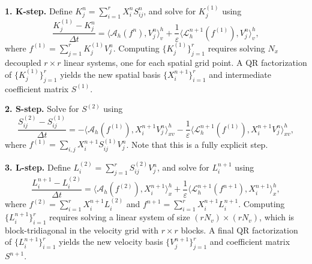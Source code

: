 \documentclass[]{article}
\numberwithin{equation}{section}
\begin{document}
\medskip
\noindent\textbf{1. K-step.} Define $K_j^n=\sum_{i=1}^r X_i^nS_{ij}^n$, and solve for $K_j^{(1)}$ using
\begin{equation}\label{eq:K_fd_imex}
  \frac{K_{j}^{(1)} - K_{j}^{n}}{\Delta t} = \langle \mathcal{A}_h(f^{n}), V_{j}^{n}\rangle_v^h + \frac{1}{\varepsilon}\langle \mathcal{L}_h^{n+1}(f^{(1)}), V_{j}^{n}\rangle_v^h,
\end{equation}
where $f^{(1)} = \sum_{j=1}^r K_{j}^{(1)} V_{j}^n$. Computing $\{K^{(1)}_j\}_{j=1}^{r}$ requires solving $N_x$ decoupled $r\times r$ linear systems,
one for each spatial grid point. A QR factorization of $\{K^{(1)}_j\}_{j=1}^{r}$ yields the new spatial basis $\{X^{n+1}_i\}_{i=1}^{r}$ and intermediate coefficient matrix $S^{(1)}$.

\noindent\textbf{2. S-step.} Solve for $S^{(2)}$ using
\begin{equation}\label{eq:S_fd_forward}
  \frac{S_{ij}^{(2)} - S_{ij}^{(1)}}{\Delta t} = - \langle \mathcal{A}_h(f^{(1)}), X_{i}^{n+1} V_{j}^{n} \rangle_{xv}^h - \frac{1}{\varepsilon}\langle \mathcal{L}_h^{n+1}(f^{(1)}), X_{i}^{n+1} V_{j}^{n} \rangle_{xv}^h,
\end{equation}
where $f^{(1)} = \sum_{i,j} X_{i}^{n+1} S_{ij}^{(1)} V_{j}^{n}$.
Note that this is a fully explicit step.

\noindent\textbf{3. L-step.} Define $L_{i}^{(2)} = \sum_{j=1}^r S_{ij}^{(2)} V_j^n$, and solve for $L_i^{n+1}$ using
\begin{equation}\label{eq:L_fd_imex}
  \frac{L_{i}^{n+1} - L_{i}^{(2)}}{\Delta t} = \langle \mathcal{A}_h(f^{(2)}), X_{i}^{n+1}\rangle_x^h + \frac{1}{\varepsilon}\langle \mathcal{L}_h^{n+1}(f^{n+1}), X_{i}^{n+1}\rangle_x^h,
\end{equation}
where $f^{(2)} = \sum_{i=1}^r X_{i}^{n+1} L_{i}^{(2)}$ and $f^{n+1}=\sum_{i=1}^r X_i^{n+1}L_i^{n+1}$. Computing $\{L_i^{n+1}\}_{i=1}^r$ requires solving a linear system of size $(rN_v)\times(rN_v)$, which is block-tridiagonal in the velocity grid with $r\times r$ blocks. A final QR factorization of $\{L^{n+1}_i\}_{i=1}^{r}$ yields the new velocity basis $\{V^{n+1}_j\}_{j=1}^{r}$ and coefficient matrix $S^{n+1}$.
\end{document}
